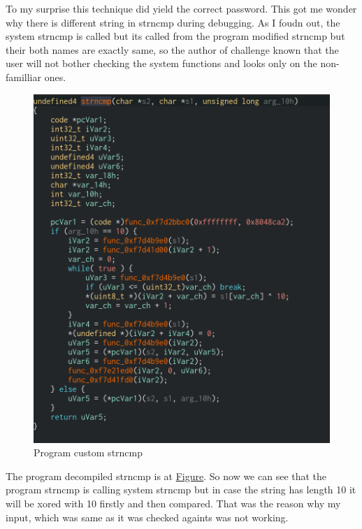 \documentclass[11pt]{article}
\begin{document}
To my surprise this technique did yield the correct password. This got me wonder why there is different string in strncmp during debugging. As I foudn out, the system strncmp is called but its called from the program modified strncmp but their both names are exactly same, so the author of challenge known that the user will not bother checking the system functions and looks only on the non-familliar ones.
\begin{figure}[htbp]
\centering
\includegraphics[width=.9\linewidth]{bombs_landed_strcmp.png}
\caption{\label{fig-strncmp}Program custom strncmp}
\end{figure}
The program decompiled strncmp is at \hyperref[fig-strncmp]{Figure}.
So now we can see that the program strncmp is calling system strncmp but in case the string has length 10 it will be xored with 10 firstly and then compared. That was the reason why my input, which was same as it was checked againts was not working.
\end{document}
